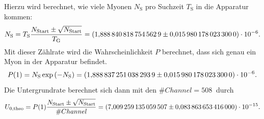 Hierzu wird berechnet, wie viele Myonen $N_{\text{S}}$ pro Suchzeit $T_{\text{S}}$ in die Apparatur kommen:
\begin{equation*}
  N_{\text{S}} = T_{\text{S}}\frac{N_{\text{Start}} \pm \sqrt{ N_{\text{Start}}} }{T_{\text{G}}} = \SI{1.8888408187545629 \pm 0.0159801780233 e-06}{}.
\end{equation*}
Mit dieser Zählrate wird die Wahrscheinlichkeit $P$ berechnet, dass sich genau ein Myon in der Apparatur befindet.
\begin{equation*}
  P(1) = N_{\text{S}} \exp{(-N_{\text{S}})} = \SI{1.8888372510382939 \pm 0.0159801780233e-06}{}.
\end{equation*}
Die Untergrundrate berechnet sich dann mit den $\# Channel=\SI{508}{}$ durch
\begin{equation*}
  U_{\text{0,theo}}= P(1) \frac{ N_{\text{Start}} \pm \sqrt{ N_{\text{Start}} }}{\# Channel} = \SI{7.009259135059507 \pm 0.083863653416 e-15}{}.
\end{equation*}
\FloatBarrier
